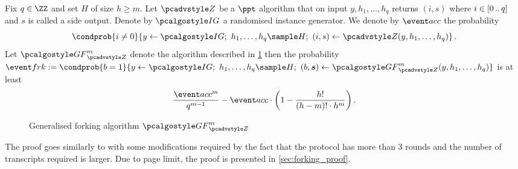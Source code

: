 \begin{lemma}
	\label{lem:generalised_forking_lemma}
	Fix $q \in \ZZ$ and set $H$ of size $h \geq m$. Let $\zdv$ be a $\ppt$
  algorithm that on input $y, h_1, \ldots, h_q$ returns $(i, s)$ where $i \in
  [0 \, .. \, q]$ and $s$ is called a side output. Denote by $\ig$ a randomised
  instance generator. We denote by $\accProb$ the probability
	\[
		\condprob{i \neq 0}{ y \gets \ig;\ h_1, \ldots, h_q \sample H;\ (i, s)
		\gets \zdv(y, h_1, \ldots, h_q)}\,.
	\]
	Let $\genforking_{\zdv}^{m}$ denote the algorithm described in
  \cref{fig:genforking_lemma} then the probability $\frkProb := \condprob{b =
    1}{y \gets \ig;\ h_1, \ldots, h_{q} \sample H;\ (b, \vec{s}) \gets
    \genforking_{\zdv}^{m}(y, h_1, \ldots, h_q)}$ is at least
	\[
		\frac{\accProb^m}{q^{m - 1}} - \accProb \cdot \left(1 -
    \frac{h!}{(h - m)! \cdot h^{m}}\right).
	\]
		
	\begin{figure}[t]
		\centering
	\caption{Generalised forking algorithm $\genforking_{\zdv}^{m}$}
	\label{fig:genforking_lemma}
\end{figure}
\end{lemma}
The proof goes similarly to \cite[Lemma 1]{CCS:BelNev06} with some modifications required
by the fact that the protocol has more than 3 rounds and the number of
transcripts required is larger. Due to page limit, the proof is presented in
\cref{sec:forking_proof}.

